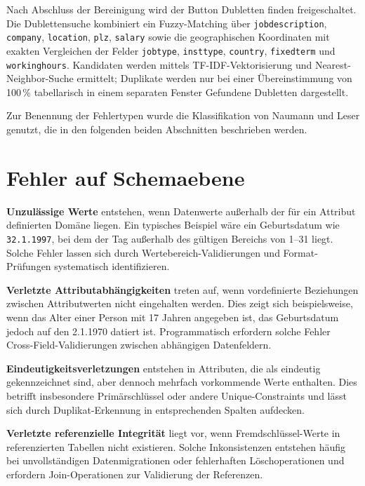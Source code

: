 \documentclass[
    a4paper,
    12pt,
    headinclude=true,
    BCOR=10mm,
]{scrreprt}
\begin{document}
Nach Abschluss der Bereinigung wird der Button \glqq Dubletten finden\grqq{} freigeschaltet. Die Dublettensuche kombiniert ein Fuzzy-Matching über \texttt{jobdescription}, \texttt{company}, \texttt{location}, \texttt{plz}, \texttt{salary} sowie die geographischen Koordinaten mit exakten Vergleichen der Felder \texttt{jobtype}, \texttt{insttype}, \texttt{country}, \texttt{fixedterm} und \texttt{workinghours}. Kandidaten werden mittels TF-IDF-Vektorisierung und Nearest-Neighbor-Suche ermittelt; Duplikate werden nur bei einer Übereinstimmung von 100\,\% tabellarisch in einem separaten Fenster \glqq Gefundene Dubletten\grqq{} dargestellt.

Zur Benennung der Fehlertypen wurde die Klassifikation von Naumann und Leser genutzt, die in den folgenden beiden Abschnitten beschrieben werden.

\section{Fehler auf Schemaebene}

\textbf{Unzulässige Werte} entstehen, wenn Datenwerte außerhalb der für ein Attribut definierten Domäne liegen. Ein typisches Beispiel wäre ein Geburtsdatum wie \texttt{32.1.1997}, bei dem der Tag außerhalb des gültigen Bereichs von 1--31 liegt. Solche Fehler lassen sich durch Wertebereich-Validierungen und Format-Prüfungen systematisch identifizieren.

\textbf{Verletzte Attributabhängigkeiten} treten auf, wenn vordefinierte Beziehungen zwischen Attributwerten nicht eingehalten werden. Dies zeigt sich beispielsweise, wenn das Alter einer Person mit 17 Jahren angegeben ist, das Geburtsdatum jedoch auf den 2.1.1970 datiert ist. Programmatisch erfordern solche Fehler Cross-Field-Validierungen zwischen abhängigen Datenfeldern.

\textbf{Eindeutigkeitsverletzungen} entstehen in Attributen, die als eindeutig gekennzeichnet sind, aber dennoch mehrfach vorkommende Werte enthalten. Dies betrifft insbesondere Primärschlüssel oder andere Unique-Constraints und lässt sich durch Duplikat-Erkennung in entsprechenden Spalten aufdecken.

\textbf{Verletzte referenzielle Integrität} liegt vor, wenn Fremdschlüssel-Werte in referenzierten Tabellen nicht existieren. Solche Inkonsistenzen entstehen häufig bei unvollständigen Datenmigrationen oder fehlerhaften Löschoperationen und erfordern Join-Operationen zur Validierung der Referenzen.
\end{document}
